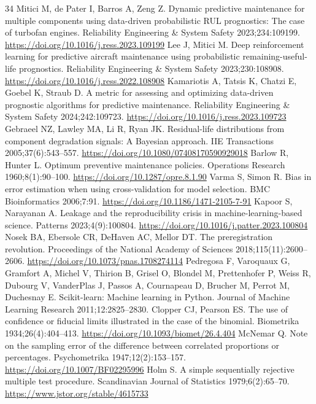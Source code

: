 \documentclass[a4paper,fleqn,doubleblind]{cas-dc}
\begin{document}
\begin{thebibliography}{34}
 Mitici M, de Pater I, Barros A, Zeng Z. Dynamic predictive maintenance for multiple components using data-driven probabilistic RUL prognostics: The case of turbofan engines. Reliability Engineering \& System Safety 2023;234:109199. \url{https://doi.org/10.1016/j.ress.2023.109199}
 Lee J, Mitici M. Deep reinforcement learning for predictive aircraft maintenance using probabilistic remaining-useful-life prognostics. Reliability Engineering \& System Safety 2023;230:108908. \url{https://doi.org/10.1016/j.ress.2022.108908}
 Kamariotis A, Tatsis K, Chatzi E, Goebel K, Straub D. A metric for assessing and optimizing data-driven prognostic algorithms for predictive maintenance. Reliability Engineering \& System Safety 2024;242:109723. \url{https://doi.org/10.1016/j.ress.2023.109723}
 Gebraeel NZ, Lawley MA, Li R, Ryan JK. Residual-life distributions from component degradation signals: A Bayesian approach. IIE Transactions 2005;37(6):543--557. \url{https://doi.org/10.1080/07408170590929018}
 Barlow R, Hunter L. Optimum preventive maintenance policies. Operations Research 1960;8(1):90--100. \url{https://doi.org/10.1287/opre.8.1.90}
 Varma S, Simon R. Bias in error estimation when using cross-validation for model selection. BMC Bioinformatics 2006;7:91. \url{https://doi.org/10.1186/1471-2105-7-91}
 Kapoor S, Narayanan A. Leakage and the reproducibility crisis in machine-learning-based science. Patterns 2023;4(9):100804. \url{https://doi.org/10.1016/j.patter.2023.100804}
 Nosek BA, Ebersole CR, DeHaven AC, Mellor DT. The preregistration revolution. Proceedings of the National Academy of Sciences 2018;115(11):2600--2606. \url{https://doi.org/10.1073/pnas.1708274114}
 Pedregosa F, Varoquaux G, Gramfort A, Michel V, Thirion B, Grisel O, Blondel M, Prettenhofer P, Weiss R, Dubourg V, VanderPlas J, Passos A, Cournapeau D, Brucher M, Perrot M, Duchesnay E. Scikit-learn: Machine learning in Python. Journal of Machine Learning Research 2011;12:2825--2830.
 Clopper CJ, Pearson ES. The use of confidence or fiducial limits illustrated in the case of the binomial. Biometrika 1934;26(4):404--413. \url{https://doi.org/10.1093/biomet/26.4.404}
 McNemar Q. Note on the sampling error of the difference between correlated proportions or percentages. Psychometrika 1947;12(2):153--157. \url{https://doi.org/10.1007/BF02295996}
 Holm S. A simple sequentially rejective multiple test procedure. Scandinavian Journal of Statistics 1979;6(2):65--70. \url{https://www.jstor.org/stable/4615733}

\end{thebibliography}
\end{document}

